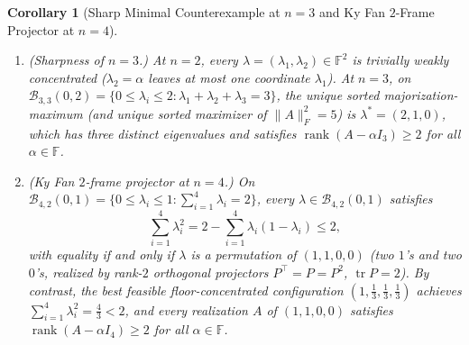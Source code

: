 \documentclass[11pt]{article}
\newtheorem{corollary}[theorem]{Corollary}
\theoremstyle{definition}
\theoremstyle{remark}
\newcommand{\tr}{\operatorname{tr}}
\newcommand{\rk}{\operatorname{rank}}
\begin{document}
\begin{corollary}[Sharp Minimal Counterexample at $n = 3$ and Ky Fan $2$-Frame Projector at $n = 4$]
\label{cor:n3-n4}
\leavevmode
\begin{enumerate}
  \item \emph{(Sharpness of $n = 3$.)} At $n = 2$, every $\lambda = (\lambda_1, \lambda_2) \in \mathbb{F}^2$ is trivially weakly concentrated ($\lambda_2 = \alpha$ leaves at most one coordinate $\lambda_1$). At $n = 3$, on $\mathcal{B}_{3,3}(0,2) = \{0 \le \lambda_i \le 2 : \lambda_1 + \lambda_2 + \lambda_3 = 3\}$, the unique sorted majorization-maximum (and unique sorted maximizer of $\|A\|_F^2 = 5$) is $\lambda^* = (2, 1, 0)$, which has three distinct eigenvalues and satisfies $\rk(A - \alpha I_3) \ge 2$ for all $\alpha \in \mathbb{F}$.
  \item \emph{(Ky Fan $2$-frame projector at $n = 4$.)} On $\mathcal{B}_{4,2}(0,1) = \{0 \le \lambda_i \le 1 : \sum_{i=1}^4 \lambda_i = 2\}$, every $\lambda \in \mathcal{B}_{4,2}(0,1)$ satisfies
  \[
    \sum_{i=1}^4 \lambda_i^2 = 2 - \sum_{i=1}^4 \lambda_i(1 - \lambda_i) \le 2,
  \]
  with equality if and only if $\lambda$ is a permutation of $(1, 1, 0, 0)$ (two $1$'s and two $0$'s, realized by rank-$2$ orthogonal projectors $P^\top = P = P^2$, $\tr P = 2$). By contrast, the best feasible floor-concentrated configuration $(1, \frac{1}{3}, \frac{1}{3}, \frac{1}{3})$ achieves $\sum_{i=1}^4 \lambda_i^2 = \frac{4}{3} < 2$, and every realization $A$ of $(1, 1, 0, 0)$ satisfies $\rk(A - \alpha I_4) \ge 2$ for all $\alpha \in \mathbb{F}$.
\end{enumerate}
\end{corollary}
\end{document}

